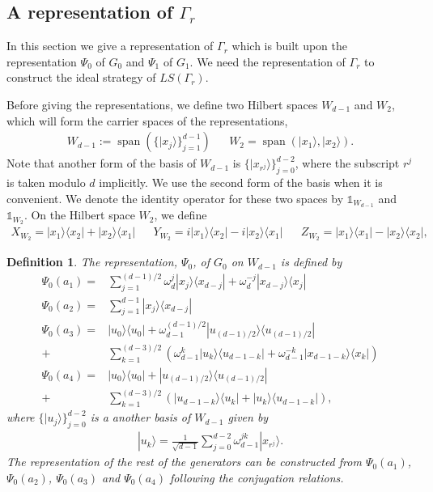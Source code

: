 \documentclass[11pt,letterpaper]{article}
\newcommand{\ket}[1]{|#1\rangle}
\newcommand{\ketbra}[2]{|#1\rangle\langle#2|}
\DeclareMathOperator{\spn}{span}
\newcommand{\1}{\mathbb{1}}
\newcommand{\LS}{LS}
\newtheorem{definition}[theorem]{Definition}
\theoremstyle{definition}
\begin{document}
\subsection{A representation of $\Gamma_r$}
In this section we give a representation of $\Gamma_r$ which is built upon the representation 
$\Psi_0$ of $G_0$ and $\Psi_1$ of $G_1$. We need the representation of $\Gamma_r$ to construct the
ideal strategy of $\LS(\Gamma_r)$.

Before giving the representations, we define two Hilbert spaces $W_{d-1}$ and $W_2$, which will form the carrier spaces
of the representations,
\begin{align}
	\label{eq:w_subspace}
	W_{d-1} := \spn(\{\ket{x_j}\}_{j=1}^{d-1}) && W_2 = \spn(\ket{x_1}, \ket{x_2}).
\end{align}
Note that another form of the basis of $W_{d-1}$ is $\{\ket{x_{r^j}}\}_{j=0}^{d-2}$, where the subscript $r^j$ is taken
modulo $d$ implicitly. We use the second form of the basis when it is convenient.
We denote the identity operator for these two spaces by $\1_{W_{d-1}}$ and $\1_{W_2}$.
On the Hilbert space $W_2$, we define
\begin{align*}
	X_{W_2} = \ketbra{x_1}{x_2} + \ketbra{x_2}{x_1} &&
	Y_{W_2} = i\ketbra{x_1}{x_2} - i \ketbra{x_2}{x_1} &&
	Z_{W_2} = \ketbra{x_1}{x_1} - \ketbra{x_2}{x_2},
\end{align*}
\begin{definition}
The representation, $\Psi_0$, of $G_0$ on $W_{d-1}$ is defined by
\begin{align*}
	\Psi_0(a_1) =&\sum_{j=1}^{(d-1)/2} \omega_d^j \ketbra{x_j}{x_{d-j}} + \omega_d^{-j} \ketbra{x_{d-j}}{x_{j}} \\
	\Psi_0(a_2) = &\sum_{j=1}^{d-1} \ketbra{x_j}{x_{d-j}}\\
	\Psi_0(a_3) = &\ketbra{u_0}{u_0} +\omega_{d-1}^{(d-1)/2}\ketbra{u_{(d-1)/2}}{u_{(d-1)/2}}\\ + 
	&\sum_{k=1}^{(d-3)/2}\left( \omega_{d-1}^k\ketbra{u_k}{u_{d-1-k}} + \omega_{d-1}^{-k}\ketbra{x_{d-1-k}}{x_k}\right)\\ 
	\Psi_0(a_4) = &\ketbra{u_0}{u_0} +\ketbra{u_{(d-1)/2}}{u_{(d-1)/2}} \\+
	 &\sum_{k=1}^{(d-3)/2}\left(\ketbra{u_{d-1-k}}{u_k} + \ketbra{u_k}{u_{d-1-k}}\right),
\end{align*}
where $\{ \ket{u_j} \}_{j=0}^{d-2}$ is a another basis of $W_{d-1}$ given by
\begin{align*}
	\ket{u_k} = \frac{1}{\sqrt{d-1}} \sum_{j=0}^{d-2} \omega_{d-1}^{jk} \ket{x_{r^j}}.
\end{align*}
The representation of the rest of the generators
can be constructed from $\Psi_0(a_1)$, $\Psi_0(a_2)$, $\Psi_0(a_3)$ and $\Psi_0(a_4)$ following the 
conjugation relations.
\end{definition}
\end{document}
